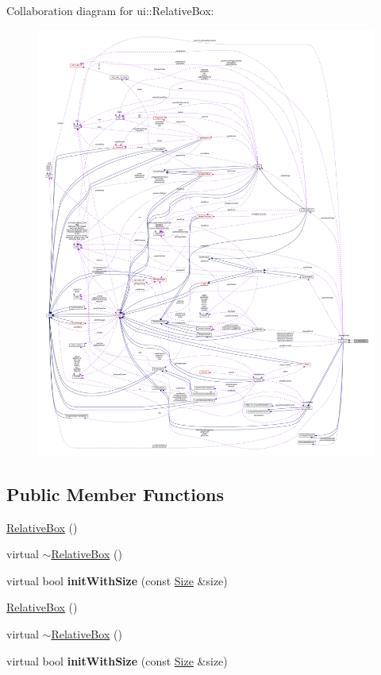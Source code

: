 Collaboration diagram for ui\+:\+:Relative\+Box\+:
\nopagebreak
\begin{figure}[H]
\begin{center}
\leavevmode
\includegraphics[width=350pt]{classui_1_1RelativeBox__coll__graph}
\end{center}
\end{figure}
\subsection*{Public Member Functions}
\begin{DoxyCompactItemize}
\item 
\hyperlink{classui_1_1RelativeBox_a8568d3154c93a3b6ca1ffcfc5d68cf89}{Relative\+Box} ()
\item 
virtual \hyperlink{classui_1_1RelativeBox_aafab5ee7d5cd33300e7a531ec27e7c13}{$\sim$\+Relative\+Box} ()
\item 
\mbox{\label{classui_1_1RelativeBox_ac746c2b11150d78f1eb2eab26f2e0b84}} 
virtual bool {\bfseries init\+With\+Size} (const \hyperlink{classSize}{Size} \&size)
\item 
\hyperlink{classui_1_1RelativeBox_a8568d3154c93a3b6ca1ffcfc5d68cf89}{Relative\+Box} ()
\item 
virtual \hyperlink{classui_1_1RelativeBox_aa707cb7604dcc542665d6ecc116df511}{$\sim$\+Relative\+Box} ()
\item 
\mbox{\label{classui_1_1RelativeBox_a1f876a1e6a02af0e33236e0e81cada12}} 
virtual bool {\bfseries init\+With\+Size} (const \hyperlink{classSize}{Size} \&size)
\end{DoxyCompactItemize}
